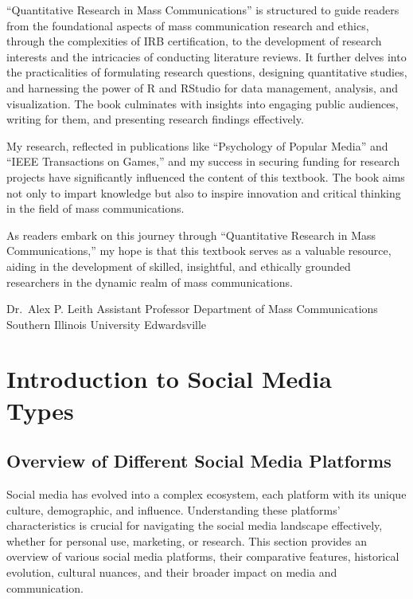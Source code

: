 \documentclass[
]{book}
\begin{document}
``Quantitative Research in Mass Communications'' is structured to guide readers from the foundational aspects of mass communication research and ethics, through the complexities of IRB certification, to the development of research interests and the intricacies of conducting literature reviews. It further delves into the practicalities of formulating research questions, designing quantitative studies, and harnessing the power of R and RStudio for data management, analysis, and visualization. The book culminates with insights into engaging public audiences, writing for them, and presenting research findings effectively.

My research, reflected in publications like ``Psychology of Popular Media'' and ``IEEE Transactions on Games,'' and my success in securing funding for research projects have significantly influenced the content of this textbook. The book aims not only to impart knowledge but also to inspire innovation and critical thinking in the field of mass communications.

As readers embark on this journey through ``Quantitative Research in Mass Communications,'' my hope is that this textbook serves as a valuable resource, aiding in the development of skilled, insightful, and ethically grounded researchers in the dynamic realm of mass communications.

Dr.~Alex P. Leith
Assistant Professor
Department of Mass Communications
Southern Illinois University Edwardsville

\hypertarget{introduction-to-social-media-types}{%
\chapter{Introduction to Social Media Types}\label{introduction-to-social-media-types}}

\hypertarget{overview-of-different-social-media-platforms}{%
\section*{Overview of Different Social Media Platforms}\label{overview-of-different-social-media-platforms}}

Social media has evolved into a complex ecosystem, each platform with its unique culture, demographic, and influence. Understanding these platforms' characteristics is crucial for navigating the social media landscape effectively, whether for personal use, marketing, or research. This section provides an overview of various social media platforms, their comparative features, historical evolution, cultural nuances, and their broader impact on media and communication.
\end{document}
